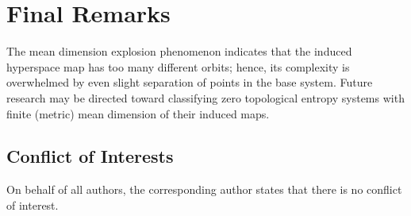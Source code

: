 \documentclass[sn-mathphys-num]{sn-jnl}%
\theoremstyle{thmstyleone}%
\theoremstyle{thmstyletwo}%
\theoremstyle{thmstylethree}%
\begin{document}

\section{Final Remarks}

The mean dimension explosion phenomenon indicates that the induced hyperspace map has too many different orbits; hence, its complexity is overwhelmed by even slight separation of points in the base system. Future research may be directed toward classifying zero topological entropy systems with finite (metric) mean dimension of their induced maps.

\subsection{Conflict of Interests} On behalf of all authors, the corresponding author states that there is no conflict of interest.






\end{document}
